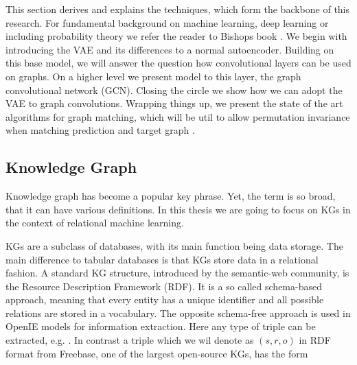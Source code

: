 

This section derives and explains the techniques, which form the backbone of this research. For fundamental background on machine learning, deep learning or including probability theory we refer the reader to Bishops book \cite{bishop_pattern_2006}. We begin with introducing the VAE and its differences to a normal autoencoder. Building on this base model, we will answer the question how convolutional layers can be used on graphs. On a higher level we present model to this layer, the graph convolutional network (GCN). Closing the circle we show how we can adopt the VAE to graph convolutions. Wrapping things up, we present the state of the art algorithms for graph matching, which will be util to allow permutation invariance when matching prediction and target graph \cite{paulheim_knowledge_2016}.  


\subsection{Knowledge Graph}

Knowledge graph has become a popular key phrase. Yet, the term is so broad, that it can have various definitions. In this thesis we are going to focus on KGs in the context of relational machine learning.

KGs are a subclass of databases, with its main function being data storage. The main difference to tabular databases is that KGs store data in a relational fashion. A standard KG structure, introduced by the semantic-web community, is the Resource
Description Framework (RDF). It is a so called schema-based approach, meaning that every entity has a unique identifier and all possible relations are stored in a vocabulary. The opposite schema-free approach is used in OpenIE models for information extraction. Here any type of triple can be extracted, e.g.  . In contrast a triple which we wil denote as $(s,r,o)$ in RDF format from Freebase, one of the largest open-source KGs, has the form

